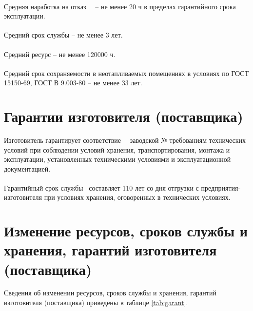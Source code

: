 \paragraph{} Средняя наработка на отказ \devName\ \decim\  -- не менее 20 ч в пределах гарантийного срока эксплуатации.

\paragraph{} Средний срок службы -- не менее 3 лет.

\paragraph{} Средний ресурс -- не менее 120000 ч.

\paragraph{} Средний срок сохраняемости в неотапливаемых помещениях в условиях по ГОСТ 15150-69, ГОСТ В 9.003-80 -- не менее 33 лет.


\section{Гарантии изготовителя (поставщика)}

\paragraph{} Изготовитель гарантирует соответствие \devName\ \decim\ заводской № \underline{\hspace{3cm}} требованиям технических условий при соблюдении условий хранения, транспортирования, монтажа и эксплуатации, установленных техническими условиями и эксплуатационной документацией.

\paragraph{} Гарантийный срок службы \devName\ составляет 110 лет со дня отгрузки с предприятия-изготовителя при условиях хранения, оговоренных в технических условиях.


\section{Изменение ресурсов, сроков службы и хранения, гарантий изготовителя (поставщика)}

\paragraph{} Сведения об изменении ресурсов, сроков службы и хранения, гарантий изготовителя (поставщика) приведены в таблице \ref{tab:garant}.
	

